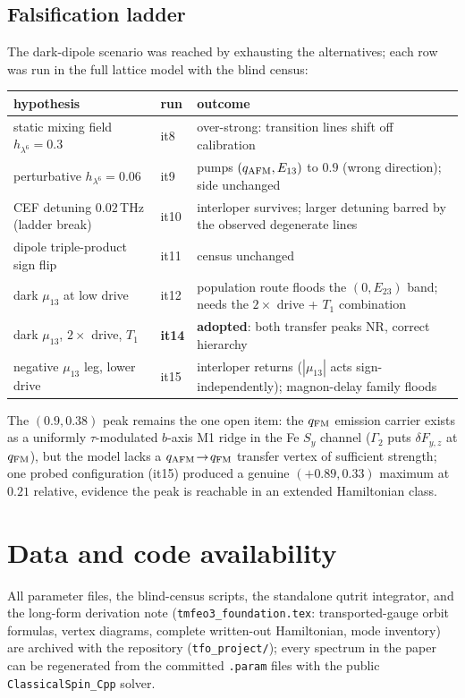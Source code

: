 \documentclass[11pt]{article}
\newcommand{\qafm}{q_{\rm AFM}}
\newcommand{\qfm}{q_{\rm FM}}
\begin{document}
\subsection{Falsification ladder}
The dark-dipole scenario was reached by exhausting the alternatives;
each row was run in the full lattice model with the blind census:
\begin{center}\small
\renewcommand{\arraystretch}{1.25}
\begin{tabular}{lll}
\toprule
hypothesis & run & outcome\\
\midrule
static mixing field $h_{\lambda^6}=0.3$ & it8 &
  over-strong: transition lines shift off calibration\\
perturbative $h_{\lambda^6}=0.06$ & it9 &
  pumps $(\qafm,E_{13})$ to $0.9$ (wrong direction); side unchanged\\
CEF detuning $0.02$\,THz (ladder break) & it10 &
  interloper survives; larger detuning barred by the observed
  degenerate lines\\
dipole triple-product sign flip & it11 & census unchanged\\
dark $\mu_{13}$ at low drive & it12 &
  population route floods the $(0,E_{23})$ band; needs the
  $2\times$ drive + $T_1$ combination\\
dark $\mu_{13}$, $2\times$ drive, $T_1$ & \textbf{it14} &
  \textbf{adopted}: both transfer peaks NR, correct hierarchy\\
negative $\mu_{13}$ leg, lower drive & it15 &
  interloper returns ($|\mu_{13}|$ acts sign-independently);
  magnon-delay family floods\\
\bottomrule
\end{tabular}
\end{center}
The $(0.9,0.38)$ peak remains the one open item: the $\qfm$ emission
carrier exists as a uniformly $\tau$-modulated $b$-axis M1 ridge in the
Fe $S_y$ channel ($\Gamma_2$ puts $\delta F_{y,z}$ at $\qfm$), but the
model lacks a $\qafm\!\to\!\qfm$ transfer vertex of sufficient
strength; one probed configuration (it15) produced a genuine
$(+0.89,0.33)$ maximum at $0.21$ relative, evidence the peak is
reachable in an extended Hamiltonian class.

\section{Data and code availability}
All parameter files, the blind-census scripts, the standalone qutrit
integrator, and the long-form derivation note
(\texttt{tmfeo3\_foundation.tex}: transported-gauge orbit formulas,
vertex diagrams, complete written-out Hamiltonian, mode inventory) are
archived with the repository
(\texttt{tfo\_project/}); every spectrum in the paper can be regenerated
from the committed \texttt{.param} files with the public
\texttt{ClassicalSpin\_Cpp} solver.
\end{document}
